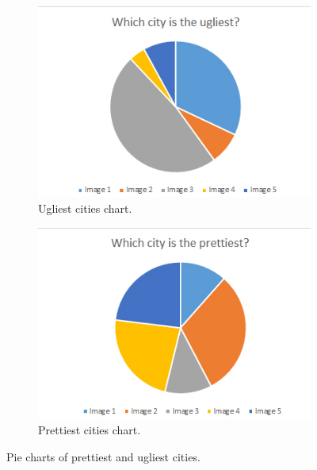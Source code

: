 \begin{figure}[h]
	\begin{subfigure}{0.5\textwidth}
		\centering
		\includegraphics[width=0.9\linewidth]{"Images/Ugliest"}
		\caption{Ugliest cities chart.}
		\label{fig:pie-chart-ugly}
	\end{subfigure}
	\begin{subfigure}{0.5\textwidth}
		\centering
		\includegraphics[width=0.9\linewidth]{"Images/Prettiest"}
		\caption{Prettiest cities chart.}
		\label{fig:pie-chart-pretty}
	\end{subfigure}
	\caption{Pie charts of prettiest and ugliest cities.}
	\label{fig:pie-chart-ugly-pretty}
\end{figure}